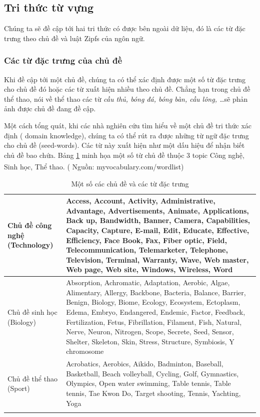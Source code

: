 \documentclass[fontsize=13pt]{scrartcl}
\begin{document}
\subsection{Tri thức từ vựng}\label{sub:wordknowledge}
Chúng ta sẽ đề cập tới hai tri thức có được bên ngoài dữ liệu, đó là các từ đặc trưng theo chủ đề và luật Zipfs của ngôn ngữ. 
\subsubsection{ Các từ đặc trưng của chủ đề}
Khi đề cập tới một chủ đề, chúng ta có thể xác định được một số từ đặc trưng cho chủ đề đó hoặc các từ xuất hiện nhiều theo chủ đề. Chẳng hạn trong chủ đề thể thao, nói về thể thao các từ \textit{ cầu thủ, bóng đá, bóng bàn, cầu lông, \ldots }sẽ phản ảnh được chủ đề đang đề cập.
\par
Một cách tổng quát, khi các nhà nghiên cứu tìm hiểu về một chủ đề tri thức xác định ( domain knowledge), chúng ta có thể rút ra được những từ ngữ đặc trưng cho chủ đề (seed-words). Các từ này xuất hiện như một dấu hiệu để nhận biết chủ đề bao chứa. Bảng \ref{tb:topicword} minh họa một số từ chủ đề thuộc 3 topic Công nghệ, Sinh học, Thể thao. ( Nguồn: myvocabulary.com/wordlist\textsuperscript{\cite{listwordtopic}})

\textbf{}
\begin{center}
\begin{longtable}{| p{} | p{} |}

\hline 
Chủ đề công nghệ \newline (Technology) & Access, Account, Activity, Administrative, Advantage, Advertisements, Animate, Applications, Back up, Bandwidth, Banner, Camera, Capabilities, Capacity, Capture,  E-mail, Edit, Educate, Effective, Efficiency, Face Book, Fax, Fiber optic, Field, Telecommunication, Telemarketer, Telephone, Television, Terminal, Warranty, Wave, Web master, Web page, Web site, Windows, Wireless, Word   \\
\hline
Chủ đề sinh học \newline (Biology) & Absorption, Achromatic, Adaptation, Aerobic, Algae, Alimentary, Allergy, Backbone, Bacteria, Balance, Barrier, Benign, Biology, Biome, Ecology, Ecosystem, Ectoplasm, Edema, Embryo, Endangered, Endemic, Factor, Feedback, Fertilization, Fetus, Fibrillation, Filament, Fish, Natural, Nerve, Neuron, Nitrogen, Scope, Secrete, Seed, Sensor, Shelter, Skeleton, Skin,  Stress, Structure, Symbiosis,  Y chromosome  \\
\hline
Chủ đề thể thao \newline (Sport) & Acrobatics, Aerobics, Aikido, Badminton, Baseball, Basketball, Beach volleyball, Cycling, Golf, Gymnastics, Olympics, Open water swimming, Table tennis, Table tennis, Tae Kwon Do, Target shooting, Tennis, Yachting, Yoga\\
\hline
\caption{Một số các chủ đề và các từ đặc trưng}
\label{tb:topicword}

\end{longtable}

\end{center}
\end{document}
